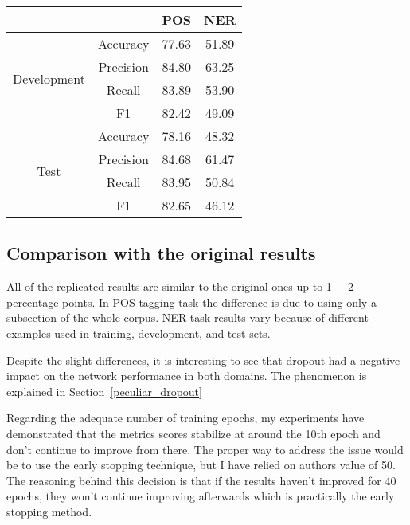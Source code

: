 \begin{center}
\begin{tabular}{ |c|c|c|c| }
\hline
& & {\textbf{POS}} & {\textbf{NER}}\\ \hline
\multirow{4}{*}{Development} & Accuracy & 77.63 & 51.89 \\
 & Precision & 84.80  & 63.25 \\
 & Recall & 83.89 & 53.90 \\
 & F1 & 82.42 & 49.09 \\ \hline
\multirow{4}{*}{Test} & Accuracy & 78.16 & 48.32 \\
 & Precision & 84.68 & 61.47 \\
 & Recall & 83.95 & 50.84 \\
 & F1 & 82.65 & 46.12 \\ \hline
\end{tabular}
\label{tab:no_crf}
\end{center}


\label{comparison}
\subsection{Comparison with the original results}
All of the replicated results are similar to the original ones up to 1 $-$ 2
percentage points. In POS tagging task the difference is due to using only a subsection of
the whole corpus. NER task results vary because of different examples used
in training, development, and test sets.

Despite the slight differences, it is interesting to see that dropout had a
negative impact on the network performance in both domains. The phenomenon is 
explained in Section~\ref{peculiar_dropout}

Regarding the adequate number of training epochs, my experiments have
demonstrated that the metrics scores stabilize at around the 10th epoch and
don't continue to improve from there. The proper way to address the issue would
be to use the early stopping technique, but I have relied on authors value of 50.
The reasoning behind this decision
is that if the results haven't improved for 40 epochs, they won't continue
improving afterwards which is practically the early stopping method.

